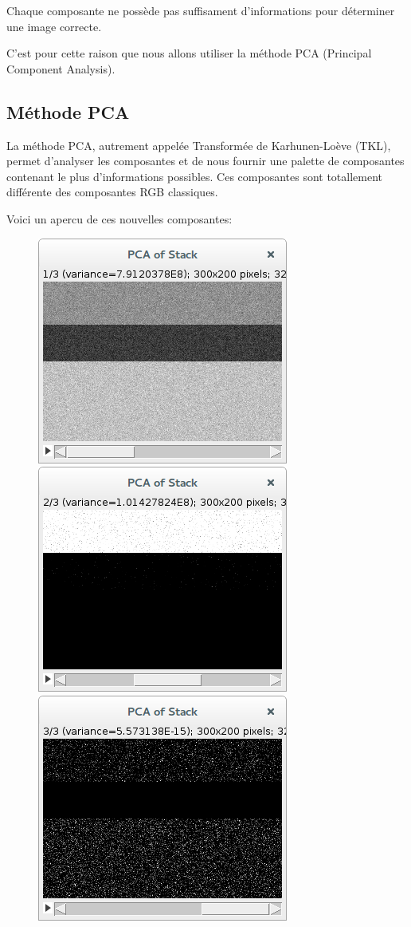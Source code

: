\documentclass[a4paper,12pt]{report}
\begin{document}
Chaque composante ne possède pas suffisament d'informations pour déterminer une image correcte.

C'est pour cette raison que nous allons utiliser la méthode PCA (Principal Component Analysis).

\subsection*{Méthode PCA}

La méthode PCA, autrement appelée Transformée de Karhunen-Loève (TKL), permet d'analyser les composantes et de nous fournir une palette de composantes contenant le plus d'informations possibles. Ces composantes sont totallement différente des composantes RGB classiques.

Voici un apercu de ces nouvelles composantes:

\begin{figure}[!ht]
	\center	
	\includegraphics[scale=0.5]{image/pca-stack-1.png}
	\includegraphics[scale=0.5]{image/pca-stack-2.png}
	\includegraphics[scale=0.5]{image/pca-stack-3.png}
\end{figure} 
\end{document}
